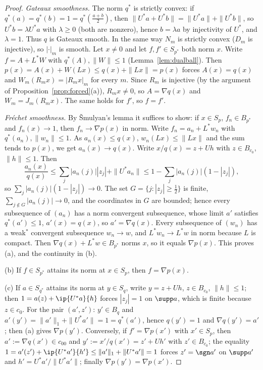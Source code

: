 \begin{proof}
\emph{Gateaux smoothness.}  The norm $q^*$ is strictly convex: if
$q^*(a)=q^*(b)=1=q^*(\frac{a+b}2)$, then $\|U^*a+U^*b\|=\|U^*a\|+\|U^*b\|$, so
$U^*b=\lambda U^*a$ with $\lambda\ge0$ (both are nonzero), hence $b=\lambda a$
by injectivity of $U^*$, and $\lambda=1$.  Thus $q$ is Gateaux smooth.  In
the same way $N_m$ is strictly convex ($D_m$ is injective), so $|\cdot|_m$
is smooth.  Let $x\neq0$ and let $f,f'\in S_{p^*}$ both norm $x$.  Write
$f=A+L^*W$ with $q^*(A),\|W\|\le1$ (Lemma~\ref{lem:dualball}).  Then
$p(x)=A(x)+W(Lx)\le q(x)+\|Lx\|=p(x)$ forces $A(x)=q(x)$ and
$W_m(R_mx)=|R_mx|_m$ for every $m$.  Since $R_m$ is injective (by the
argument of Proposition~\ref{prop:forced}(a)), $R_mx\ne0$, so $A=\nabla q(x)$
and $W_m=J_m(R_mx)$.  The same holds for $f'$, so $f=f'$.

\emph{Fr\'echet smoothness.}  By \v{S}mulyan's lemma it suffices to show:
if $x\in S_p$, $f_n\in B_{p^*}$ and $f_n(x)\to1$, then
$f_n\to\nabla p(x)$ in norm.  Write $f_n=a_n+L^*w_n$ with
$q^*(a_n),\|w_n\|\le1$.  As $a_n(x)\le q(x)$, $w_n(Lx)\le\|Lx\|$ and the
sum tends to $p(x)$, we get $a_n(x)\to q(x)$.  Write $x/q(x)=z+Uh$ with
$z\in B_{c_0}$, $\|h\|\le1$.  Then
\[
 \frac{a_n(x)}{q(x)}\le\sum_j|a_n(j)||z_j|+\|U^*a_n\|
 \le1-\sum_j|a_n(j)|(1-|z_j|),
\]
so $\sum_j|a_n(j)|(1-|z_j|)\to0$.  The set $G=\{j:|z_j|\ge\frac12\}$ is
finite, $\sum_{j\notin G}|a_n(j)|\to0$, and the coordinates in $G$ are
bounded; hence every subsequence of $(a_n)$ has a norm convergent
subsequence, whose limit $a'$ satisfies $q^*(a')\le1$, $a'(x)=q(x)$, so
$a'=\nabla q(x)$.  Every subsequence of $(w_n)$ has a weak$^*$ convergent
subsequence $w_n\to w$, and $L^*w_n\to L^*w$ in norm because $L$ is
compact.  Then $\nabla q(x)+L^*w\in B_{p^*}$ norms $x$, so it equals
$\nabla p(x)$.  This proves (a), and the continuity in (b).

(b) If $f\in S_{p^*}$ attains its norm at $x\in S_p$, then $f=\nabla p(x)$.

(c) If $a\in S_{q^*}$ attains its norm at $y\in S_q$, write $y=z+Uh$,
$z\in B_{c_0}$, $\|h\|\le1$; then $1=a(z)+\ip{U^*a}{h}$ forces
$|z_j|=1$ on $\supp a$, which is finite because $z\in c_0$.  For the
pair $(a',z')$: $y'\in B_q$ and
$a'(y')=\|a'\|_1+\|U^*a'\|=1=q^*(a')$, hence $q(y')=1$ and
$\nabla q(y')=a'$; then (a) gives $\nabla p(y')$.  Conversely, if
$f'=\nabla p(x')$ with $x'\in S_p$, then $a':=\nabla q(x')\in c_{00}$ and
$y':=x'/q(x')=z'+Uh'$ with $z'\in B_{c_0}$; the equality
$1=a'(z')+\ip{U^*a'}{h'}\le\|a'\|_1+\|U^*a'\|=1$ forces $z'=\sgn a'$ on
$\supp a'$ and $h'=U^*a'/\|U^*a'\|$; finally $\nabla p(y')=\nabla p(x')$.
\end{proof}

